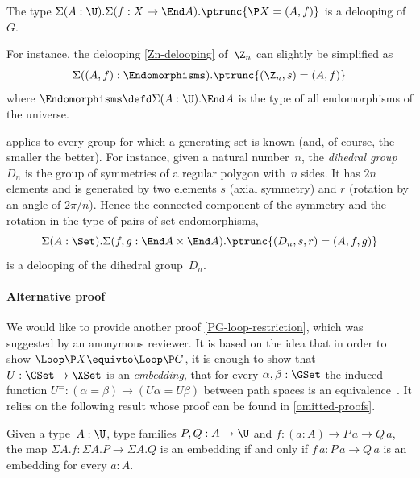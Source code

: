 \begin{proposition}
  The type $\Sigma(A:\U).\Sigma(f:X \to\End A).\ptrunc{\P X=(A,f)}$ is a delooping
  of~$G$.
\end{proposition}

\noindent
For instance, the delooping \cref{Zn-delooping} of~$\Z_n$ can slightly be
simplified as
\[
  \Sigma((A,f):\Endomorphisms).\ptrunc{(\Z_n,s)=(A,f)}
\]
where $\Endomorphisms\defd\Sigma(A:\U).\End A$ is the type of all endomorphisms
of the universe.

\begin{example}
  \label{Dn}
   applies to every group for which a generating set
  is known (and, of course, the smaller the better). For instance, given a
  natural number~$n$, the \emph{dihedral group}~$D_n$ is the group of symmetries
  of a regular polygon with~$n$ sides. It has $2n$ elements and is generated by
  two elements $s$ (axial symmetry) and $r$ (rotation by an angle of
  $2\pi/n$). Hence the connected component of the symmetry and the rotation in
  the type of pairs of set endomorphisms, \ie
  \[
    \Sigma(A:\Set).\Sigma(f, g : \End A\times\End A).\ptrunc{(D_n,s,r)=(A,f,g)}
  \]
  is a delooping of the dihedral group~$D_n$.
\end{example}

\paragraph{Alternative proof}
We would like to provide another proof \cref{PG-loop-restriction}, which was suggested by an anonymous reviewer.
It is based on the idea that in order to show $\Loop\P X\equivto\Loop\P G$, it is enough to show that $U:\GSet\to\XSet$ is an \emph{embedding}, \ie that for every $\alpha,\beta:\GSet$ the induced function $U^=:(\alpha=\beta)\to(U\alpha=U\beta)$ between path spaces is an equivalence~\cite[Definition~4.6.1]{hottbook}.
It relies on the following result whose proof can be found in \cref{omitted-proofs}.

\begin{lemma}
  \label{fiberwise-embedding}
  Given a type~$A:\U$, type families $P,Q:A\to\U$ and $f:(a:A)\to P\,a\to Q\,a$, the map $\Sigma A.f:\Sigma A.P\to\Sigma A.Q$ is an embedding if and only
  if $f\,a:P\,a\to Q\,a$ is an embedding for every $a:A$.
\end{lemma}

